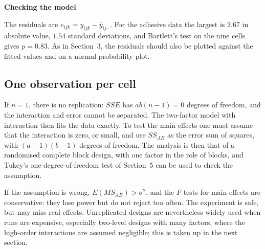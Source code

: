 \documentclass[11pt,a4paper]{article}
\numberwithin{equation}{section}
\theoremstyle{definition}
\newcommand{\subhead}[1]{%
  \par\medskip\noindent\textbf{#1}\par\nobreak\smallskip}
\begin{document}
\subhead{Checking the model}
The residuals are $e_{ijk} = y_{ijk} - \bar y_{ij\cdot}$. For the adhesive data the largest is $2.67$ in absolute value, $1.54$ standard deviations, and Bartlett's test on the nine cells
gives $p = 0.83$. As in Section~3, the residuals should also be plotted against the fitted values and on a normal probability plot.

\subsection{One observation per cell}
If $n = 1$, there is no replication: $SSE$ has $ab(n - 1) = 0$ degrees of freedom, and the interaction and error cannot be separated. The two-factor model
with interaction then fits the data exactly. To test the main effects one must assume that the interaction is zero, or small, and use $SS_{AB}$ as the
error sum of squares, with $(a - 1)(b - 1)$ degrees of freedom. The analysis is then that of a randomised complete block design, with one factor
in the role of blocks, and Tukey's one-degree-of-freedom test of Section~5 can be used to check the assumption.

If the assumption is wrong, $E(MS_{AB}) > \sigma^2$, and the $F$ tests for main effects are conservative: they lose power but do not reject too often. The
experiment is safe, but may miss real effects. Unreplicated designs are nevertheless widely used when runs are expensive, especially
two-level designs with many factors, where the high-order interactions are assumed negligible; this is taken up in the next section.
\end{document}

